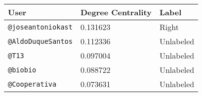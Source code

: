     \begin{tabular}{lll}
    \toprule\toprule
        User & Degree Centrality & Label \\ \midrule
        \texttt{@joseantoniokast} & 0.131623 & Right \\ 
        \texttt{@AldoDuqueSantos} & 0.112336 & Unlabeled \\
        \texttt{@T13} & 0.097004 & Unlabeled \\ 
        \texttt{@biobio} & 0.088722 & Unlabeled \\ 
        \texttt{@Cooperativa} & 0.073631 & Unlabeled \\ 
       
        \bottomrule\bottomrule
    \end{tabular}


